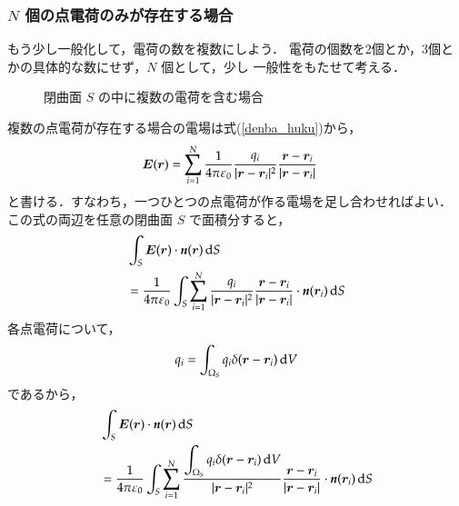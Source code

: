         \subsubsection{$N$ 個の点電荷のみが存在する場合}
            もう少し一般化して，電荷の数を複数にしよう．
            電荷の個数を2個とか，3個とかの具体的な数にせず，$N$ 個として，少し
            一般性をもたせて考える．
                \begin{figure}[hbt]
                    \begin{center}
                        \caption{閉曲面 $S$ の中に複数の電荷を含む場合}
                        \label{fig:Gauss_huku_tendenka}
                    \end{center}
                \end{figure}
            複数の点電荷が存在する場合の電場は式(\ref{denba_huku})から，
            \begin{align}
                \boldsymbol{E}(\boldsymbol{r})&=\sum_{i=1}^{N}\frac{1}{4\pi\varepsilon_{0}}
                \frac{q_{i}}{|\boldsymbol{r}-\boldsymbol{r}_{i}|^{2}}
                \frac{\boldsymbol{r}-\boldsymbol{r}_{i}}
                     {|\boldsymbol{r}-\boldsymbol{r}_{i}|}
            \end{align}
            と書ける．すなわち，一つひとつの点電荷が作る電場を足し合わせればよい．
            この式の両辺を任意の閉曲面 $S$ で面積分すると，
            \begin{align*}
                &\int_{S}\boldsymbol{E}(\boldsymbol{r})\cdot\textit{\textbf{n}}(\boldsymbol{r})\,\mathrm{d} S \\
                &=\frac{1}{4\pi\varepsilon_{0}}\int_{S} \sum_{i=1}^{N}
                \frac{q_{i}}
                    {|\boldsymbol{r}-\boldsymbol{r}_{i}|^{2}}
                \frac{\boldsymbol{r}-\boldsymbol{r}_{i}}
                     {|\boldsymbol{r}-\boldsymbol{r}_{i}|}\cdot\textit{\textbf{n}}(\boldsymbol{r}_{i})\,\mathrm{d} S
            \end{align*}
            各点電荷について，
            \begin{align}
            q_{i}=\int_{\Omega_{S}}q_{i}\delta(\boldsymbol{r}-\boldsymbol{r}_{i})\,\mathrm{d} V
            \end{align}
            であるから，
            \begin{align*}
                &\int_{S}\boldsymbol{E}(\boldsymbol{r})\cdot\textit{\textbf{n}}(\boldsymbol{r})\,\mathrm{d} S \\
                &=\frac{1}{4\pi\varepsilon_{0}}\int_{S} \sum_{i=1}^{N}
                \frac{\displaystyle\int_{\Omega_{S}}q_{i}\delta(\boldsymbol{r}-\boldsymbol{r}_{i})\,\mathrm{d} V}
                {|\boldsymbol{r}-\boldsymbol{r}_{i}|^{2}}
                \frac{\boldsymbol{r}-\boldsymbol{r}_{i}}
                     {|\boldsymbol{r}-\boldsymbol{r}_{i}|}\cdot\textit{\textbf{n}}
                    (\boldsymbol{r}_{i})\,\mathrm{d} S \\
            \end{align*}

